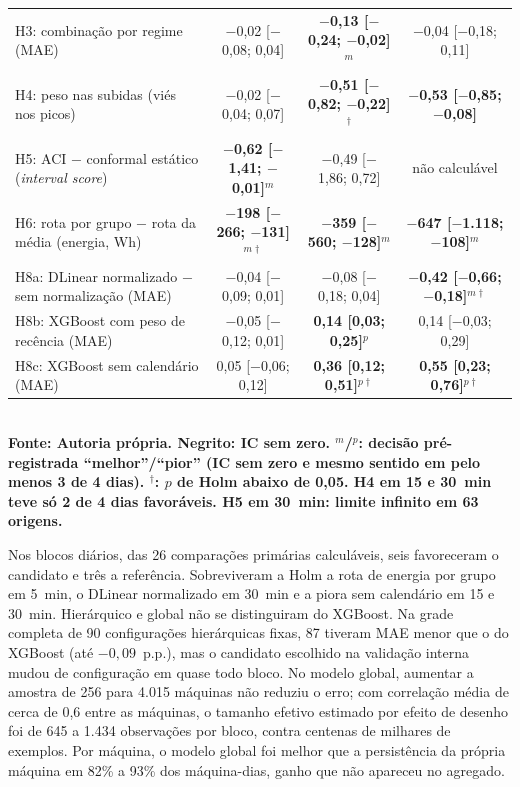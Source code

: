 \documentclass[a4paper,12pt]{article}
\begin{document}
\begin{table}[htbp]
\begin{tabularx}{\textwidth}{|P{5.4cm}|C|C|C|}
H3: combinação por regime (MAE) & $-$0,02 [$-$0,08; 0,04] & \textbf{$-$0,13 [$-$0,24; $-$0,02]}$^{m}$ & $-$0,04 [$-$0,18; 0,11] \\
H4: peso nas subidas (viés nos picos) & $-$0,02 [$-$0,04; 0,07] & \textbf{$-$0,51 [$-$0,82; $-$0,22]}$^{\dagger}$ & \textbf{$-$0,53 [$-$0,85; $-$0,08]} \\
H5: ACI $-$ conformal estático (\textit{interval score}) & \textbf{$-$0,62 [$-$1,41; $-$0,01]}$^{m}$ & $-$0,49 [$-$1,86; 0,72] & não calculável \\
H6: rota por grupo $-$ rota da média (energia, Wh) & \textbf{$-$198 [$-$266; $-$131]}$^{m\dagger}$ & \textbf{$-$359 [$-$560; $-$128]}$^{m}$ & \textbf{$-$647 [$-$1.118; $-$108]}$^{m}$ \\
H8a: DLinear normalizado $-$ sem normalização (MAE) & $-$0,04 [$-$0,09; 0,01] & $-$0,08 [$-$0,18; 0,04] & \textbf{$-$0,42 [$-$0,66; $-$0,18]}$^{m\dagger}$ \\
H8b: XGBoost com peso de recência (MAE) & $-$0,05 [$-$0,12; 0,01] & \textbf{0,14 [0,03; 0,25]}$^{p}$ & 0,14 [$-$0,03; 0,29] \\
H8c: XGBoost sem calendário (MAE) & 0,05 [$-$0,06; 0,12] & \textbf{0,36 [0,12; 0,51]}$^{p\dagger}$ & \textbf{0,55 [0,23; 0,76]}$^{p\dagger}$ \\
\hline
\end{tabularx}
\\[0.2cm]
\textbf{\footnotesize Fonte: Autoria própria. Negrito: IC sem zero. $^{m}$/$^{p}$: decisão pré-registrada ``melhor''/``pior'' (IC sem zero e mesmo sentido em pelo menos 3 de 4 dias). $^\dagger$: $p$ de Holm abaixo de 0,05. H4 em 15 e 30~min teve só 2 de 4 dias favoráveis. H5 em 30~min: limite infinito em 63 origens.}
\end{table}

Nos blocos diários, das 26 comparações primárias calculáveis, seis favoreceram o candidato e três a referência. Sobreviveram a Holm a rota de energia por grupo em 5~min, o DLinear normalizado em 30~min e a piora sem calendário em 15 e 30~min. Hierárquico e global não se distinguiram do XGBoost. Na grade completa de 90 configurações hierárquicas fixas, 87 tiveram MAE menor que o do XGBoost (até $-0{,}09$~p.p.), mas o candidato escolhido na validação interna mudou de configuração em quase todo bloco. No modelo global, aumentar a amostra de 256 para 4.015 máquinas não reduziu o erro; com correlação média de cerca de 0,6 entre as máquinas, o tamanho efetivo estimado por efeito de desenho foi de 645 a 1.434 observações por bloco, contra centenas de milhares de exemplos. Por máquina, o modelo global foi melhor que a persistência da própria máquina em 82\% a 93\% dos máquina-dias, ganho que não apareceu no agregado.
\end{document}
